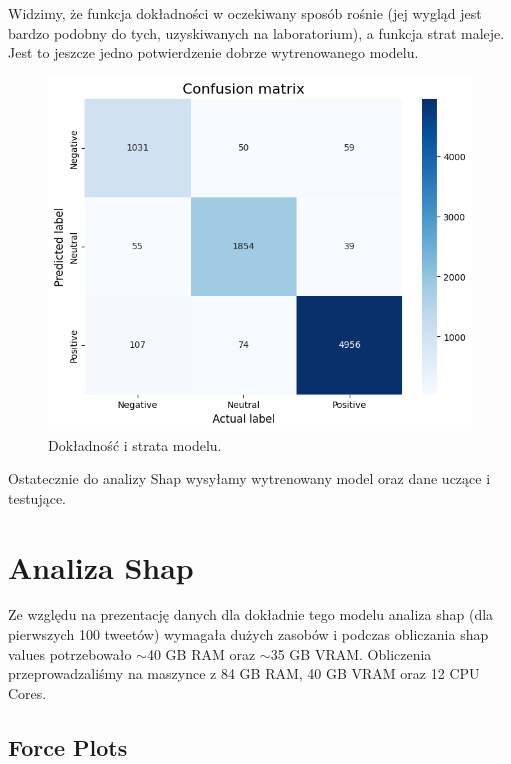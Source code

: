 \documentclass{article}
\begin{document}
\noindent Widzimy, że funkcja dokładności w oczekiwany sposób rośnie (jej wygląd jest bardzo podobny do tych, uzyskiwanych na laboratorium), a funkcja strat maleje. Jest to jeszcze jedno potwierdzenie dobrze wytrenowanego modelu.

\begin{figure}[htp]
\centering
\includegraphics[scale=0.436]{assets/model_confusion_matrix.png}
\caption{Dokładność i strata modelu.}
\label{fig:photo}
\end{figure}

\noindent Ostatecznie do analizy Shap wysyłamy wytrenowany model oraz dane uczące i testujące.

\newpage

\section{Analiza Shap}

\noindent Ze względu na prezentację danych dla dokładnie tego modelu analiza shap (dla pierwszych 100 tweetów) wymagała dużych zasobów i podczas obliczania shap values potrzebowało \(\sim \)40 GB RAM oraz \(\sim \)35 GB VRAM. Obliczenia przeprowadzaliśmy na maszynce z 84 GB RAM, 40 GB VRAM oraz 12 CPU Cores.

\subsection{Force Plots}
\end{document}
